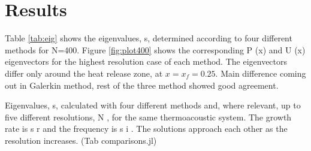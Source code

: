 
\section{Results}

Table \ref{tab:eig} shows the eigenvalues, s, determined according to four different
methods for N=400. Figure \ref{fig:plot400} shows the corresponding P (x) and U (x) eigenvectors for the highest
resolution case of each method. The eigenvectors differ only around the heat release zone, at $x = x_f = 0.25$. Main difference coming out in Galerkin method, rest of the three method showed good agreement.

\pagebreak

\begin{table}[]
	\caption{Eigenvalues, s, calculated with four different methods and, where relevant,
		up to five different resolutions, N , for the same thermoacoustic system. The growth
		rate is s r and the frequency is s i . The solutions approach each other as the resolution
		increases. (Tab comparisons.jl)}
	

\end{table}
